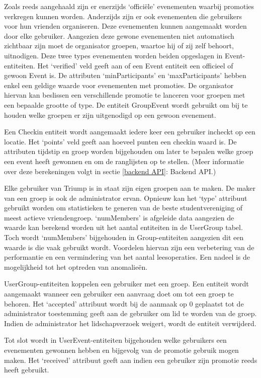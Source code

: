 Zoals reeds aangehaald zijn er enerzijds `officiële' evenementen waarbij promoties verkregen kunnen worden. Anderzijds zijn er ook evenementen die gebruikers voor hun vrienden organiseren. Deze evenementen kunnen aangemaakt worden door elke gebruiker. Aangezien deze gewone evenementen niet automatisch zichtbaar zijn moet de organisator groepen, waartoe hij of zij zelf behoort, uitnodigen. 
Deze twee types evenementen worden beiden opgeslagen in Event-entiteiten. Het `verified' veld geeft aan of een Event entiteit een officieel of gewoon Event is. De attributen `minParticipants' en `maxParticipants' hebben enkel een geldige waarde voor evenementen met promoties. De organisator hiervan kan beslissen een verschillende promotie te lanceren voor groepen met een bepaalde grootte of type. De entiteit GroupEvent wordt gebruikt om bij te houden welke groepen er zijn uitgenodigd op een gewoon evenement.

Een Checkin entiteit wordt aangemaakt iedere keer een gebruiker incheckt op een locatie. Het `points' veld geeft aan hoeveel punten een checkin waard is. De attributen tijdstip en groep worden bijgehouden om later te bepalen welke groep een event heeft gewonnen en om de ranglijsten op te stellen. (Meer informatie over deze berekeningen volgt in sectie \ref{backend API}: Backend API.)

Elke gebruiker van Triump is in staat zijn eigen groepen aan te maken. De maker van een groep is ook de administrator ervan. Opnieuw kan het `type' attribuut gebruikt worden om statistieken te generen van de beste studentvereniging of meest actieve vriendengroep. `numMembers' is afgeleide data aangezien de waarde kan berekend worden uit het aantal entiteiten in de UserGroup tabel. Toch wordt `numMembers' bijgehouden in Group-entiteiten aangezien dit een waarde is die vaak gebruikt wordt. Voordelen hiervan zijn een verbetering van de performantie en een vermindering van het aantal leesoperaties. Een nadeel is de mogelijkheid tot het optreden van anomalieën.

UserGroup-entiteiten koppelen een gebruiker met een groep. Een entiteit wordt aangemaakt wanneer een gebruiker een aanvraag doet om tot een groep te behoren. Het `accepted' attribuut wordt bij de aanmaak op 0 geplaatst tot de administrator toestemming geeft aan de gebruiker om lid te worden van de groep. Indien de administrator het lidschapverzoek weigert, wordt de entiteit verwijderd.

Tot slot wordt in UserEvent-entiteiten bijgehouden welke gebruikers een evenementen gewonnen hebben en bijgevolg van de promotie gebruik mogen maken. Het `received' attribuut geeft aan indien een gebruiker zijn promotie reeds heeft gebruikt.

